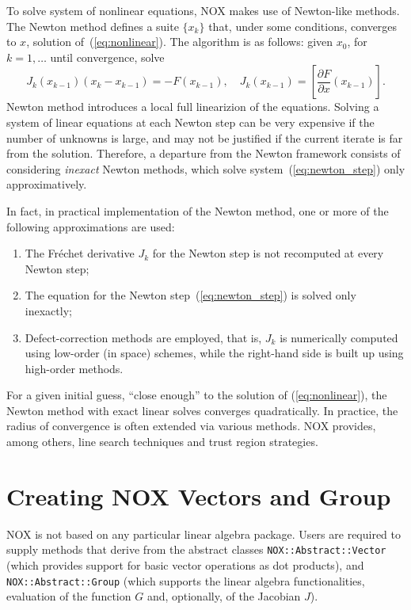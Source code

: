 To solve system of nonlinear equations, NOX makes use of Newton-like methods.
The Newton method defines a suite $\{ x_k\}$ that, under some
conditions, converges to $x$, solution of~(\ref{eq:nonlinear}).
The algorithm is as follows: given $x_0$, for $k=1,\ldots$ until
convergence, solve
\begin{equation}
J_k  (x_{k-1})\left ( x_{k} - x_{k-1} \right) = 
- F(x_{k-1}),\quad
J_k  (x_{k-1}) =  \left[ \frac{ \partial F}{
        \partial x}( x_{k-1}) \right] .
\label{eq:newton_step}
\end{equation}
Newton method introduces a local full linearizion of the equations.
Solving a system of linear equations at each Newton step can be very
expensive if the number of unknowns is large, and may not be justified
if the current iterate is far from the solution. Therefore, a departure
from the Newton framework consists of considering {\em inexact} Newton
methods, which solve system~(\ref{eq:newton_step}) only approximatively.

In fact, in practical implementation of the Newton method, one or more
of the following approximations are used:
\begin{enumerate}
\item The Fr\'echet derivative $J_k$ for the Newton step is not
  recomputed at every Newton step;
\item The equation for the Newton step~(\ref{eq:newton_step}) is solved
  only inexactly;
\item Defect-correction methods are employed, that is, $J_k$ is
  numerically computed using low-order (in space) schemes, while the
  right-hand side is built up using high-order methods.
\end{enumerate}

For a given initial guess, ``close enough'' to the solution of
(\ref{eq:nonlinear}), the Newton method with exact linear solves
converges quadratically. In practice, the radius of convergence is often
extended via various methods. NOX provides, among others, line search
techniques and trust region strategies.


\section{Creating NOX Vectors and Group}
\label{sec:nox_intro}

NOX is not based on any particular linear algebra package. Users are
required to supply methods that derive from the abstract classes
\verb!NOX::Abstract::Vector! (which provides support for basic vector
operations as dot products), and \verb!NOX::Abstract::Group!  (which
supports the linear algebra functionalities, evaluation of the function
$G$ and, optionally, of the Jacobian $J$).

